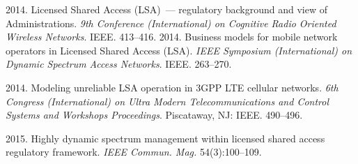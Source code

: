 \begin{multicols}{2}
{{\begin{thebibliography}{99}
 2014. Licensed Shared Access (LSA)~--- 
regulatory background and view of Administrations. \textit{9th Conference (International) on 
Cognitive Radio Oriented Wireless Networks}. IEEE. 413--416.
 2014. Business 
models for mobile network operators in Licensed Shared Access (LSA). \textit{IEEE Symposium 
(International) on Dynamic Spectrum Access Networks}. IEEE. 263--270.

 2014. Modeling unreliable LSA 
operation in 3GPP LTE cellular networks. \textit{6th Congress (International) on Ultra Modern 
Telecommunications and Control Systems and Workshops Proceedings}. Piscataway, NJ: IEEE.  
490--496.

 2015. Highly dynamic spectrum management within licensed shared access regulatory 
framework. \textit{IEEE Commun. Mag.} 54(3):100--109.


\end{thebibliography}}}
\end{multicols}

